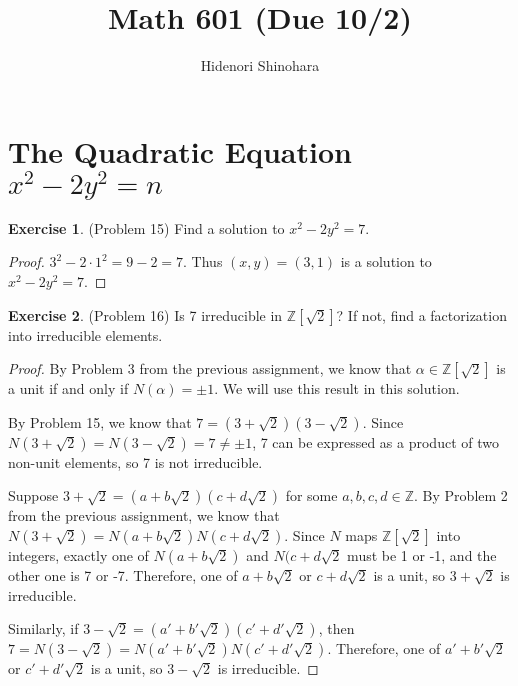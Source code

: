 \documentclass[12pt, psamsfonts]{amsart}
\theoremstyle{definition}
\newtheorem*{exer}{Exercise}
\theoremstyle{remark}
\numberwithin{equation}{section}
\begin{document}
\title{Math 601 (Due 10/2)}
\author{Hidenori Shinohara}
\maketitle

\tableofcontents

\section{The Quadratic Equation $x^2 - 2y^2 = n$}
\begin{exer}{(Problem 15)}
  Find a solution to $x^2 - 2y^2 = 7$.
\end{exer}

\begin{proof}
  $3^2 - 2 \cdot 1^2 = 9 - 2 = 7$.
  Thus $(x, y) = (3, 1)$ is a solution to $x^2 - 2y^2 = 7$.
\end{proof}

\begin{exer}{(Problem 16)}
  Is 7 irreducible in $\mathbb{Z}[\sqrt{2}]$?
  If not, find a factorization into irreducible elements.
\end{exer}

\begin{proof}
  By Problem 3 from the previous assignment, we know that $\alpha \in \mathbb{Z}[\sqrt{2}]$ is a unit if and only if $N(\alpha) = \pm 1$.
  We will use this result in this solution.

  By Problem 15, we know that $7 = (3 + \sqrt{2})(3 - \sqrt{2})$.
  Since $N(3 + \sqrt{2}) = N(3 - \sqrt{2}) = 7 \ne \pm 1$, 7 can be expressed as a product of two non-unit elements, so 7 is not irreducible.

  Suppose $3 + \sqrt{2} = (a + b\sqrt{2})(c + d\sqrt{2})$ for some $a, b, c, d \in \mathbb{Z}$.
  By Problem 2 from the previous assignment, we know that $N(3 + \sqrt{2}) = N(a + b\sqrt{2})N(c + d\sqrt{2})$.
  Since $N$ maps $\mathbb{Z}[\sqrt{2}]$ into integers, exactly one of $N(a + b\sqrt{2})$ and $N(c + d\sqrt{2}$ must be 1 or -1, and the other one is 7 or -7.
  Therefore, one of $a + b\sqrt{2}$ or $c + d\sqrt{2}$ is a unit, so $3 + \sqrt{2}$ is irreducible.

  Similarly, if $3 - \sqrt{2} = (a' + b'\sqrt{2})(c' + d'\sqrt{2})$, then $7 = N(3 - \sqrt{2}) = N(a' + b'\sqrt{2})N(c' + d'\sqrt{2})$.
  Therefore, one of $a' + b'\sqrt{2}$ or $c' + d'\sqrt{2}$ is a unit, so $3 - \sqrt{2}$ is irreducible.
\end{proof}
\end{document}
